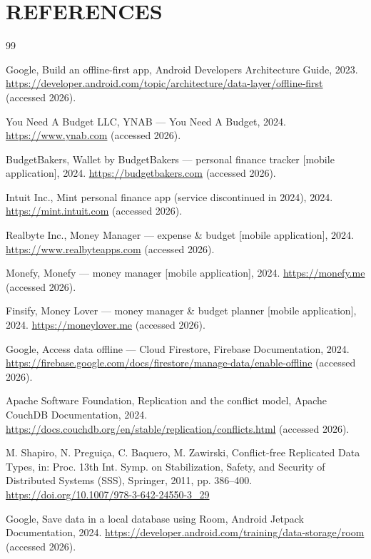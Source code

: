 \documentclass[13pt,a4paper]{extarticle}
\begin{document}
\section*{REFERENCES}
\begin{thebibliography}{99}

 Google, Build an offline-first app, Android Developers Architecture Guide, 2023. \url{https://developer.android.com/topic/architecture/data-layer/offline-first} (accessed 2026).

 You Need A Budget LLC, YNAB --- You Need A Budget, 2024. \url{https://www.ynab.com} (accessed 2026).

 BudgetBakers, Wallet by BudgetBakers --- personal finance tracker [mobile application], 2024. \url{https://budgetbakers.com} (accessed 2026).

 Intuit Inc., Mint personal finance app (service discontinued in 2024), 2024. \url{https://mint.intuit.com} (accessed 2026).

 Realbyte Inc., Money Manager --- expense \& budget [mobile application], 2024. \url{https://www.realbyteapps.com} (accessed 2026).

 Monefy, Monefy --- money manager [mobile application], 2024. \url{https://monefy.me} (accessed 2026).

 Finsify, Money Lover --- money manager \& budget planner [mobile application], 2024. \url{https://moneylover.me} (accessed 2026).

 Google, Access data offline --- Cloud Firestore, Firebase Documentation, 2024. \url{https://firebase.google.com/docs/firestore/manage-data/enable-offline} (accessed 2026).

 Apache Software Foundation, Replication and the conflict model, Apache CouchDB Documentation, 2024. \url{https://docs.couchdb.org/en/stable/replication/conflicts.html} (accessed 2026).

 M. Shapiro, N. Pregui\c{c}a, C. Baquero, M. Zawirski, Conflict-free Replicated Data Types, in: Proc. 13th Int. Symp. on Stabilization, Safety, and Security of Distributed Systems (SSS), Springer, 2011, pp. 386--400. \url{https://doi.org/10.1007/978-3-642-24550-3_29}

 Google, Save data in a local database using Room, Android Jetpack Documentation, 2024. \url{https://developer.android.com/training/data-storage/room} (accessed 2026).


\end{thebibliography}
\end{document}
